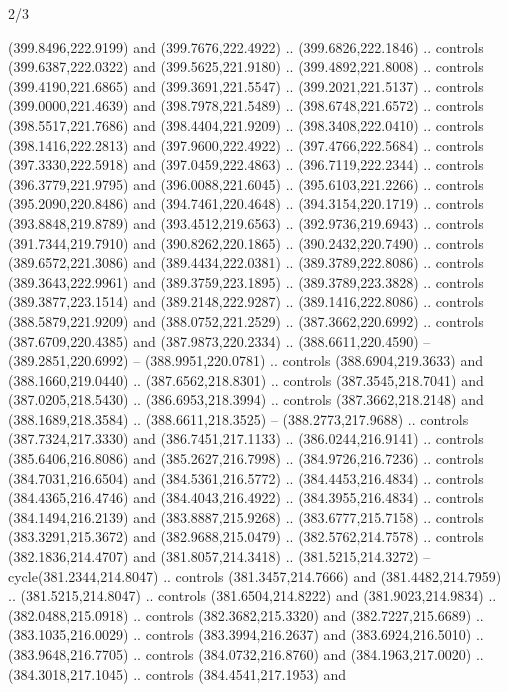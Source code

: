 \begin{flagdescription}{2/3}
\begin{scope}[xshift=0.5\flaglength,yshift=0.5\flagwidth,scale=\flagwidth/495.65]
\begin{scope}[y=0.8pt, x=0.8pt, yscale=-1,shift={(-463.76,-309.78)}]
  (399.8496,222.9199) and (399.7676,222.4922) .. (399.6826,222.1846) .. controls
  (399.6387,222.0322) and (399.5625,221.9180) .. (399.4892,221.8008) .. controls
  (399.4190,221.6865) and (399.3691,221.5547) .. (399.2021,221.5137) .. controls
  (399.0000,221.4639) and (398.7978,221.5489) .. (398.6748,221.6572) .. controls
  (398.5517,221.7686) and (398.4404,221.9209) .. (398.3408,222.0410) .. controls
  (398.1416,222.2813) and (397.9600,222.4922) .. (397.4766,222.5684) .. controls
  (397.3330,222.5918) and (397.0459,222.4863) .. (396.7119,222.2344) .. controls
  (396.3779,221.9795) and (396.0088,221.6045) .. (395.6103,221.2266) .. controls
  (395.2090,220.8486) and (394.7461,220.4648) .. (394.3154,220.1719) .. controls
  (393.8848,219.8789) and (393.4512,219.6563) .. (392.9736,219.6943) .. controls
  (391.7344,219.7910) and (390.8262,220.1865) .. (390.2432,220.7490) .. controls
  (389.6572,221.3086) and (389.4434,222.0381) .. (389.3789,222.8086) .. controls
  (389.3643,222.9961) and (389.3759,223.1895) .. (389.3789,223.3828) .. controls
  (389.3877,223.1514) and (389.2148,222.9287) .. (389.1416,222.8086) .. controls
  (388.5879,221.9209) and (388.0752,221.2529) .. (387.3662,220.6992) .. controls
  (387.6709,220.4385) and (387.9873,220.2334) .. (388.6611,220.4590) --
  (389.2851,220.6992) -- (388.9951,220.0781) .. controls (388.6904,219.3633) and
  (388.1660,219.0440) .. (387.6562,218.8301) .. controls (387.3545,218.7041) and
  (387.0205,218.5430) .. (386.6953,218.3994) .. controls (387.3662,218.2148) and
  (388.1689,218.3584) .. (388.6611,218.3525) -- (388.2773,217.9688) .. controls
  (387.7324,217.3330) and (386.7451,217.1133) .. (386.0244,216.9141) .. controls
  (385.6406,216.8086) and (385.2627,216.7998) .. (384.9726,216.7236) .. controls
  (384.7031,216.6504) and (384.5361,216.5772) .. (384.4453,216.4834) .. controls
  (384.4365,216.4746) and (384.4043,216.4922) .. (384.3955,216.4834) .. controls
  (384.1494,216.2139) and (383.8887,215.9268) .. (383.6777,215.7158) .. controls
  (383.3291,215.3672) and (382.9688,215.0479) .. (382.5762,214.7578) .. controls
  (382.1836,214.4707) and (381.8057,214.3418) .. (381.5215,214.3272) --
  cycle(381.2344,214.8047) .. controls (381.3457,214.7666) and
  (381.4482,214.7959) .. (381.5215,214.8047) .. controls (381.6504,214.8222) and
  (381.9023,214.9834) .. (382.0488,215.0918) .. controls (382.3682,215.3320) and
  (382.7227,215.6689) .. (383.1035,216.0029) .. controls (383.3994,216.2637) and
  (383.6924,216.5010) .. (383.9648,216.7705) .. controls (384.0732,216.8760) and
  (384.1963,217.0020) .. (384.3018,217.1045) .. controls (384.4541,217.1953) and

\end{scope}
\end{scope}
\end{flagdescription}
